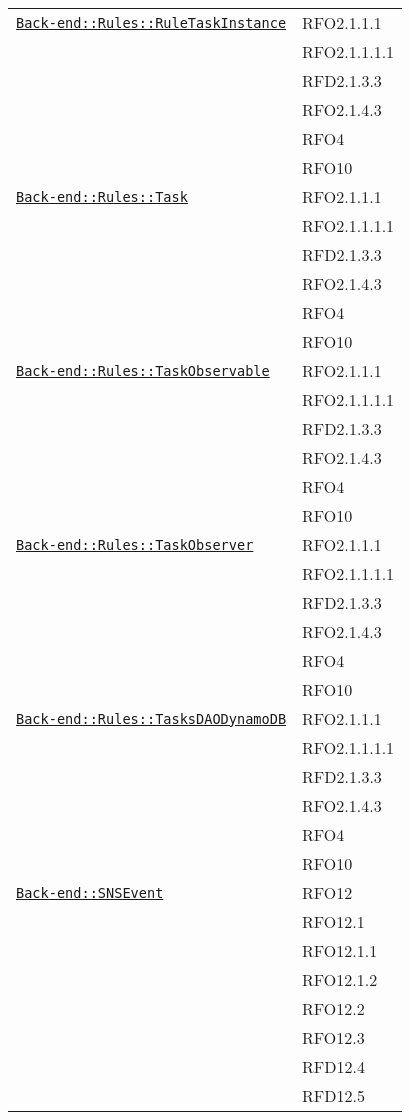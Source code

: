 \begin{longtable}{|>{\centering}m{10cm}|m{3cm}<{\centering}|}
\hyperref[Back-end::Rules::RuleTaskInstance]{\texttt{Back-end::Rules::RuleTaskInstance}} & RFO2.1.1.1\\
& RFO2.1.1.1.1\\
& RFD2.1.3.3\\
& RFO2.1.4.3\\
& RFO4\\
& RFO10\\ \hline

\hyperref[Back-end::Rules::Task]{\texttt{Back-end::Rules::Task}} & RFO2.1.1.1\\
& RFO2.1.1.1.1\\
& RFD2.1.3.3\\
& RFO2.1.4.3\\
& RFO4\\
& RFO10\\ \hline

\hyperref[Back-end::Rules::TaskObservable]{\texttt{Back-end::Rules::TaskObservable}} & RFO2.1.1.1\\
& RFO2.1.1.1.1\\
& RFD2.1.3.3\\
& RFO2.1.4.3\\
& RFO4\\
& RFO10\\ \hline

\hyperref[Back-end::Rules::TaskObserver]{\texttt{Back-end::Rules::TaskObserver}} & RFO2.1.1.1\\
& RFO2.1.1.1.1\\
& RFD2.1.3.3\\
& RFO2.1.4.3\\
& RFO4\\
& RFO10\\ \hline

\hyperref[Back-end::Rules::TasksDAODynamoDB]{\texttt{Back-end::Rules::TasksDAODynamoDB}} & RFO2.1.1.1\\
& RFO2.1.1.1.1\\
& RFD2.1.3.3\\
& RFO2.1.4.3\\
& RFO4\\
& RFO10\\ \hline

\hyperref[Back-end::SNSEvent]{\texttt{Back-end::SNSEvent}} & RFO12\\
& RFO12.1\\
& RFO12.1.1\\
& RFO12.1.2\\
& RFO12.2\\
& RFO12.3\\
& RFD12.4\\
& RFD12.5\\ \hline


\end{longtable}
